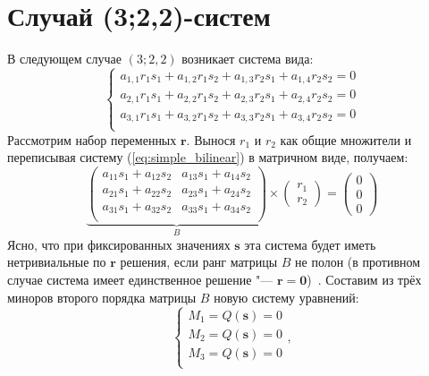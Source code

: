 \documentclass[10pt]{article}
\begin{document}
\section{Случай (3;2,2)-систем}
В следующем случае $(3; 2, 2)$ возникает система вида:
\begin{equation}\label{eq:simple_bilinear}
	\begin{cases}
		a_{1,1} r_1 s_1 + a_{1,2} r_1 s_2 + a_{1,3} r_2 s_1 + a_{1,4} r_2 s_2 = 0 \\
		a_{2,1} r_1 s_1 + a_{2,2} r_1 s_2 + a_{2,3} r_2 s_1 + a_{2,4} r_2 s_2 = 0 \\
		a_{3,1} r_1 s_1 + a_{3,2} r_1 s_2 + a_{3,3} r_2 s_1 + a_{3,4} r_2 s_2 = 0 \\
	\end{cases}
\end{equation}
Рассмотрим набор переменных $\mathbf{r}$. Вынося $r_1$ и $r_2$ как общие множители и переписывая систему (\ref{eq:simple_bilinear}) в матричном виде, получаем: 
\begin{equation}\label{eq:r_bilinear}
        \underbrace{
        \begin{pmatrix}
                a_{11} s_1 + a_{12} s_2 & a_{13} s_1 + a_{14} s_2 \\
                a_{21} s_1 + a_{22} s_2 & a_{23} s_1 + a_{24} s_2 \\
                a_{31} s_1 + a_{32} s_2 & a_{33} s_1 + a_{34} s_2 \\
        \end{pmatrix}}_{B}
        \times
        \begin{pmatrix}
                r_1 \\
                r_2
        \end{pmatrix}=
        \begin{pmatrix}
                0 \\
                0 \\
                0
        \end{pmatrix}
\end{equation}
Ясно, что при фиксированных значениях $\mathbf{s}$ эта система будет иметь 
нетривиальные по $\mathbf{r}$ решения, если ранг матрицы $B$ не полон (в противном случае 
система имеет единственное решение "--- $\mathbf{r} = \mathbf{0}$)~\cite{costrikin_va1}. 
Составим из трёх миноров второго порядка матрицы $B$ новую систему уравнений:
\begin{equation}
	\begin{cases} 
		M_1 = Q(\mathbf{s}) = 0 \\
		M_2 = Q(\mathbf{s}) = 0 \\
		M_3 = Q(\mathbf{s}) = 0 \\
	\end{cases},
\end{equation}
\end{document}

